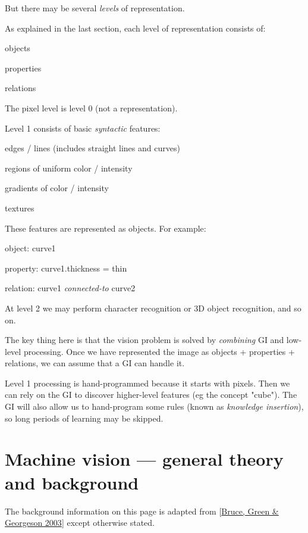 But there may be several \emph{levels} of representation.

As explained in the last section, each level of representation consists of:
\begin{compactenum}
	\item objects
	\item properties
	\item relations
\end{compactenum}

The pixel level is level 0 (not a representation).

 Level 1 consists of basic \emph{syntactic} features:
\begin{compactenum}
	\item edges / lines (includes straight lines and curves)
	\item regions of uniform color / intensity
	\item gradients of color / intensity
	\item textures
\end{compactenum}

These features are represented as objects. For example:
\begin{compactenum}
	\item object: curve1
	\item property: curve1.thickness = thin
	\item relation: curve1 \emph{connected-to} curve2
\end{compactenum}

At level 2 we may perform character recognition or 3D object recognition, and so on. 

The key thing here is that the vision problem is solved by  \emph{combining} GI and low-level processing. Once we have represented the image as objects + properties + relations, we can assume that a GI can handle it.

Level 1 processing is hand-programmed because it starts with pixels. Then we can rely on the GI to discover higher-level features (eg the concept "cube"). The GI will also allow us to hand-program some rules (known as \emph{knowledge insertion}), so  long periods of learning may be skipped.

\section{Machine vision --- general theory and background}

The background information on this page is adapted from [\hyperlink{ref}{Bruce, Green \& Georgeson 2003}] except otherwise stated.

